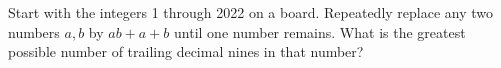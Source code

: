 Start with the integers 1 through 2022 on a board. Repeatedly replace any two numbers $a,b$ by $ab+a+b$ until one number remains. What is the greatest possible number of trailing decimal nines in that number?
